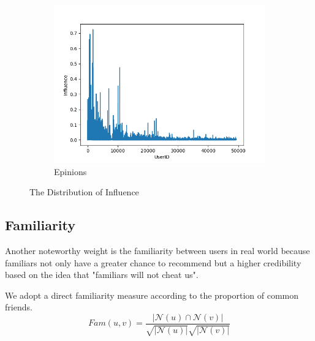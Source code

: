 \documentclass{article}
\begin{document}
\begin{figure}[h]
\begin{subfigure}{0.33\textwidth}
        \includegraphics[width=1\linewidth]{pic/figure4_3.png}
        \caption{Epinions}
    \end{subfigure}
  \caption{The Distribution of Influence}
\end{figure}
\subsection{Familiarity}
Another noteworthy weight is the familiarity between users in real world
because familiars not only have a greater chance to recommend but a higher credibility 
based on the idea that "familiars will not cheat us". 

We adopt a direct familiarity measure \cite{liang2012pr} according to the proportion of common friends.
\begin{equation}
  Fam(u, v) = \frac{\vert \mathcal{N}(u) \cap \mathcal{N}(v) \vert}{\sqrt{\vert \mathcal{N}(u) \vert} \sqrt{\vert \mathcal{N}(v) \vert}}
\end{equation}
\end{document}

